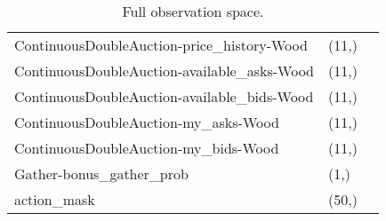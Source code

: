 \begin{table}[]
\begin{tabular}{lll}
    ContinuousDoubleAuction-price\_history-Wood   & (11,)       &                             \\ 
    ContinuousDoubleAuction-available\_asks-Wood  & (11,)       &                             \\ 
    ContinuousDoubleAuction-available\_bids-Wood  & (11,)       &                             \\ 
    ContinuousDoubleAuction-my\_asks-Wood         & (11,)       &                             \\ 
    ContinuousDoubleAuction-my\_bids-Wood         & (11,)       &                             \\ 
    Gather-bonus\_gather\_prob                    & (1,)        &                             \\ 
    action\_mask                                  & (50,)       &                             \\ \hline
    \end{tabular}
    \caption{\label{tab:full_obs} Full observation space.}
\end{table}

